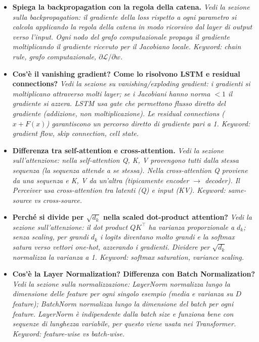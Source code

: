 \documentclass[
  11pt,
]{article}
\begin{document}
\begin{itemize}

  \item \textbf{Spiega la backpropagation con la regola della catena.}
  \textit{Vedi la sezione sulla backpropagation: il gradiente della loss rispetto a ogni parametro si calcola applicando la regola della catena in modo ricorsivo dal layer di output verso l'input. Ogni nodo del grafo computazionale propaga il gradiente moltiplicando il gradiente ricevuto per il Jacobiano locale. Keyword: chain rule, grafo computazionale, $\partial \mathcal{L}/\partial w$.}

  \item \textbf{Cos'è il vanishing gradient? Come lo risolvono LSTM e residual connections?}
  \textit{Vedi la sezione su vanishing/exploding gradient: i gradienti si moltiplicano attraverso molti layer; se i Jacobiani hanno norma $<1$ il gradiente si azzera. LSTM usa gate che permettono flusso diretto del gradiente (addizione, non moltiplicazione). Le residual connections ($x + F(x)$) garantiscono un percorso diretto di gradiente pari a 1. Keyword: gradient flow, skip connection, cell state.}

  \item \textbf{Differenza tra self-attention e cross-attention.}
  \textit{Vedi la sezione sull'attenzione: nella self-attention Q, K, V provengono tutti dalla stessa sequenza (la sequenza attende a se stessa). Nella cross-attention Q proviene da una sequenza e K, V da un'altra (tipicamente encoder $\to$ decoder). Il Perceiver usa cross-attention tra latenti (Q) e input (KV). Keyword: same-source vs cross-source.}

  \item \textbf{Perché si divide per $\sqrt{d_k}$ nella scaled dot-product attention?}
  \textit{Vedi la sezione sull'attenzione: il dot product $QK^\top$ ha varianza proporzionale a $d_k$; senza scaling, per grandi $d_k$ i logits diventano molto grandi e la softmax satura verso vettori one-hot, azzerando i gradienti. Dividere per $\sqrt{d_k}$ normalizza la varianza a 1. Keyword: softmax saturation, variance scaling.}

  \item \textbf{Cos'è la Layer Normalization? Differenza con Batch Normalization?}
  \textit{Vedi la sezione sulla normalizzazione: LayerNorm normalizza \emph{lungo la dimensione delle feature} per ogni singolo esempio (media e varianza su $D$ feature); BatchNorm normalizza \emph{lungo la dimensione del batch} per ogni feature. LayerNorm è indipendente dalla batch size e funziona bene con sequenze di lunghezza variabile, per questo viene usata nei Transformer. Keyword: feature-wise vs batch-wise.}


\end{itemize}
\end{document}
